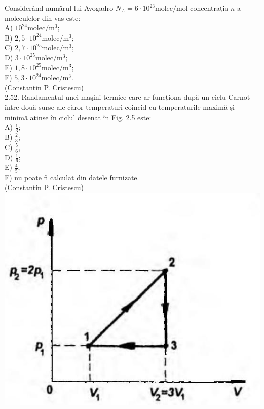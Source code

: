 \documentclass[10pt]{article}
\begin{document}
Considerând numǎrul lui Avogadro $N_{A}=6 \cdot 10^{23} \mathrm{molec} / \mathrm{mol}$ concentrația $n$ a moleculelor din vas este:\\
A) $10^{24} \mathrm{molec} / \mathrm{m}^{3}$;\\
B) $2,5 \cdot 10^{24} \mathrm{molec} / \mathrm{m}^{3}$;\\
C) $2,7 \cdot 10^{25} \mathrm{molec} / \mathrm{m}^{3}$;\\
D) $3 \cdot 10^{25} \mathrm{molec} / \mathrm{m}^{3}$;\\
E) $1,8 \cdot 10^{25} \mathrm{molec} / \mathrm{m}^{3}$;\\
F) $5,3 \cdot 10^{24} \mathrm{molec} / \mathrm{m}^{3}$.\\
(Constantin P. Cristescu)\\
2.52. Randamentul unei maşini termice care ar funcționa după un ciclu Carnot între două surse ale căror temperaturi coincid cu temperaturile maximă şi minimă atinse în ciclul desenat în Fig. 2.5 este:\\
A) $\frac{1}{3}$;\\
B) $\frac{2}{3}$;\\
C) $\frac{5}{6}$,\\
D) $\frac{1}{6}$;\\
E) $\frac{4}{5}$;\\
F) nu poate fi calculat din datele furnizate.\\
(Constantin P. Cristescu)\\
\includegraphics[max width=\textwidth, center]{2025_07_01_5b3ff9fa0d508c8e9f17g-084}\\
\end{document}
